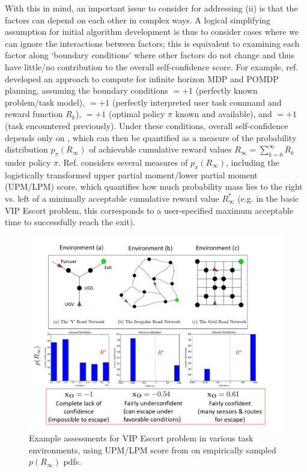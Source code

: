 With this in mind, an important issue to consider for addressing (ii) is that the factors can depend on each other in complex ways. A logical simplifying assumption for initial algorithm development is thus to consider cases where we can ignore the interactions between factors; this is equivalent to examining each factor along `boundary conditions' where other factors do not change and thus have little/no contribution to the overall self-confidence score. For example, ref. \cite{Aitken2016-cv} developed an approach to compute \xO{} for infinite horizon MDP and POMDP planning, assuming the boundary conditions \xM$=+1$ (perfectly known problem/task model), \xI $= +1$ (perfectly interpreted user task command and reward function $R_k$), \xQ$=+1$ (optimal policy $\pi$ known and available), and \xP$=+1$ (task encountered previously). Under these conditions, overall self-confidence depends only on \xO, which can then be quantified as a measure of the probability distribution $p_{\pi}(R_{\infty})$ of achievable cumulative reward values $R_{\infty} = \sum_{k=0}^{\infty}R_{k}$ under policy $\pi$. Ref. \cite{Aitken2016-cv} considers several measures of $p_{\pi}(R_{\infty})$, including the logistically transformed upper partial moment/lower partial moment (UPM/LPM) score, which quantifies how much probability mass lies to the right vs. left of a minimally acceptable cumulative reward value $R^*_{\infty}$ (e.g. in the basic VIP Escort problem, this corresponds to a user-specified maximum acceptable time to successfully reach the exit).
\begin{figure}[tbp]
    \centering
    \includegraphics[width=0.90\linewidth]{Figures/xO_envsOnly.png}
    \caption{Example \xO{} assessments for VIP Escort problem in various task environments, using UPM/LPM score from \cite{Aitken2016-cv} on empirically sampled $p(R_{\infty})$ pdfs.}
    \label{fig:xOexample}
    \vspace{-0.5cm}
\end{figure}


